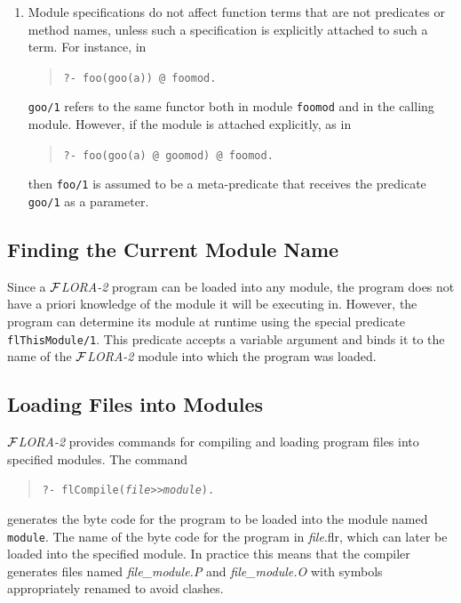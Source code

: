 \documentclass[11pt]{article}
\newcommand{\FLORA}{{\mbox{${\cal F}${\small\it LORA}\rm\emph{-2}}}\xspace}
\begin{document}
\begin{enumerate}
\item Module specifications do not affect function terms that are not
  predicates or method names, unless such a specification is explicitly
  attached to such a term. For instance, in
  \begin{quote}
    \verb|?- foo(goo(a)) @ foomod.|
  \end{quote}
  {\tt goo/1} refers to the same functor both in module {\tt foomod} and in
  the calling module. However, if the module is attached explicitly, as in
  \begin{quote}
    \verb|?- foo(goo(a) @ goomod) @ foomod.|
  \end{quote}
  then {\tt foo/1} is assumed to be a meta-predicate that receives the
  predicate {\tt goo/1}  as a parameter.
\end{enumerate}


\subsection{Finding the Current Module Name}

%
Since a \FLORA program can be loaded into any module, the program does not
have a priori knowledge of the module it will be executing in. However, the
program can determine its module at runtime using the special predicate
{\tt flThisModule/1}.  This predicate accepts a variable argument and binds
it to the name of the \FLORA module into which the program was loaded.




\subsection{Loading Files into Modules}\label{sec-loading-mods}

%

\FLORA provides commands for compiling and loading program files into
specified modules.
The
command 
\begin{quote}
  {\tt ?- flCompile({\it file}>>{\it module}).}
\end{quote}
generates the byte code for the program to be loaded into the module named
{\tt module}. The name of the byte code for the program in \emph{file}.flr,
which can later be loaded into the specified module. In practice this means
that the compiler generates files named \emph{file\_module.P} and
\emph{file\_module.O} with symbols appropriately renamed to avoid clashes.
\end{document}
